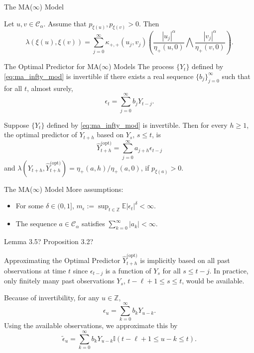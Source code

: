 \documentclass{beamer}
\def\E{\mathbb E}
\def\I{\mathbb I}
\def\Z{{\mathbb Z}}
\def\seqSet{\mathcal{C}_{\alpha}}
\def\series{\xi}
\newcommand{\mmultiplier}[4]{\kappa_{#1, #2}(#3, #4)}
\newcommand{\normConst}[3]{\eta_{#1}({#2}, {#3})}
\newcommand{\pred}[1]{\hat{Y}_{t + h}^{\text{(#1)}}}
\begin{document}
\begin{frame}{The MA($\infty$) Model}
    \begin{lemma}
        Let $u, v \in \seqSet$. Assume that $p_{\series(u)}, p_{\series(v)} > 0$. Then
        \[
        \lambda\left(\series(u), \series(v)\right)
        = \sum_{j = 0}^{\infty} \mmultiplier{+}{+}{u_j}{v_j}\left(\frac{|u_j|^{\alpha}}{\normConst{+}{u}{0}} \bigwedge \frac{|v_j|^{\alpha}}{\normConst{+}{v}{0}}\right).
        \]
    \end{lemma}
\end{frame}

\begin{frame}{The Optimal Predictor for MA($\infty$) Models}
    The process $\{Y_t\}$ defined by \eqref{eq:ma_infty_mod} is invertible if there exists a real sequence $\{b_j\}_{j = 0}^{\infty}$ such that for all $t$, almost surely,
    \[
    \epsilon_t = \sum_{j = 0}^{\infty} b_j Y_{t - j}.
    \]

    \begin{theorem}
        Suppose $\{Y_t\}$ defined by \eqref{eq:ma_infty_mod} is invertible. Then for every $h \ge 1$, the optimal predictor of $Y_{t + h}$ based on $Y_s$, $s \le t$, is
        \[
        \pred{opt} = \sum_{j = 0}^{\infty} a_{j + h}\epsilon_{t - j}
        \]
        and $\lambda(Y_{t + h}, \pred{opt}) = \normConst{+}{a}{h} / \normConst{+}{a}{0}$, if $p_{\series(a)} > 0$.
    \end{theorem}
\end{frame}

\begin{frame}{The MA($\infty$) Model}
    More assumptions:
    \begin{itemize}
        \item For some $\delta\in (0,1]$, $m_\epsilon :=\sup_{t\in \mathbb Z} \E|\epsilon_t|^\delta <\infty$.
        \item The sequence $a \in \seqSet$ satisfies $\sum_{k=0}^\infty |a_k| <\infty$.
    \end{itemize}
    Lemma 3.5? Proposition 3.2?
\end{frame}

\begin{frame}{Approximating the Optimal Predictor}
    $\pred{opt}$ is implicitly based on all past observations at time $t$ since $\epsilon_{t - j}$ is a function of $Y_s$ for all $s \le t - j$. In practice, only finitely many past observations $Y_s$, $t - \ell + 1 \le s \le t$, would be available.

    \medskip
    
    Because of invertibility, for any $u \in \Z$,
    \[
    \epsilon_u = \sum_{k = 0}^{\infty} b_k Y_{u - k}.
    \]
    Using the available observations, we approximate this by
    \[
    \tilde{\epsilon}_u = \sum_{k = 0}^{\infty} b_k Y_{u - k}\I(t - \ell + 1 \le u - k \le t).
    \]
\end{frame}
\end{document}
